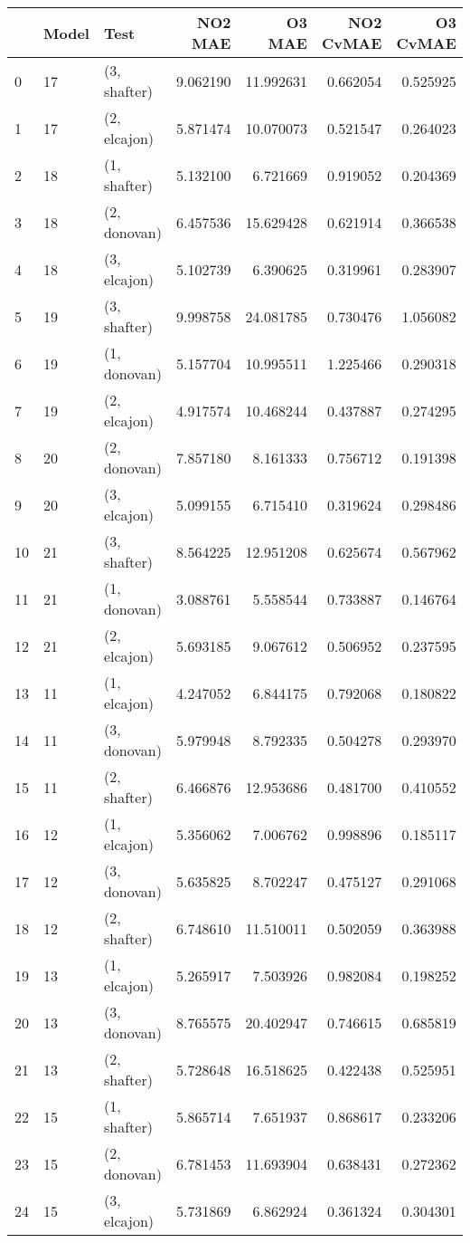 \begin{tabular}{lllrrrr}
\toprule
{} & Model &          Test &   NO2 MAE &     O3 MAE &  NO2 CvMAE &  O3 CvMAE \\
\midrule
0  &    17 &  (3, shafter) &  9.062190 &  11.992631 &   0.662054 &  0.525925 \\
1  &    17 &  (2, elcajon) &  5.871474 &  10.070073 &   0.521547 &  0.264023 \\
2  &    18 &  (1, shafter) &  5.132100 &   6.721669 &   0.919052 &  0.204369 \\
3  &    18 &  (2, donovan) &  6.457536 &  15.629428 &   0.621914 &  0.366538 \\
4  &    18 &  (3, elcajon) &  5.102739 &   6.390625 &   0.319961 &  0.283907 \\
5  &    19 &  (3, shafter) &  9.998758 &  24.081785 &   0.730476 &  1.056082 \\
6  &    19 &  (1, donovan) &  5.157704 &  10.995511 &   1.225466 &  0.290318 \\
7  &    19 &  (2, elcajon) &  4.917574 &  10.468244 &   0.437887 &  0.274295 \\
8  &    20 &  (2, donovan) &  7.857180 &   8.161333 &   0.756712 &  0.191398 \\
9  &    20 &  (3, elcajon) &  5.099155 &   6.715410 &   0.319624 &  0.298486 \\
10 &    21 &  (3, shafter) &  8.564225 &  12.951208 &   0.625674 &  0.567962 \\
11 &    21 &  (1, donovan) &  3.088761 &   5.558544 &   0.733887 &  0.146764 \\
12 &    21 &  (2, elcajon) &  5.693185 &   9.067612 &   0.506952 &  0.237595 \\
13 &    11 &  (1, elcajon) &  4.247052 &   6.844175 &   0.792068 &  0.180822 \\
14 &    11 &  (3, donovan) &  5.979948 &   8.792335 &   0.504278 &  0.293970 \\
15 &    11 &  (2, shafter) &  6.466876 &  12.953686 &   0.481700 &  0.410552 \\
16 &    12 &  (1, elcajon) &  5.356062 &   7.006762 &   0.998896 &  0.185117 \\
17 &    12 &  (3, donovan) &  5.635825 &   8.702247 &   0.475127 &  0.291068 \\
18 &    12 &  (2, shafter) &  6.748610 &  11.510011 &   0.502059 &  0.363988 \\
19 &    13 &  (1, elcajon) &  5.265917 &   7.503926 &   0.982084 &  0.198252 \\
20 &    13 &  (3, donovan) &  8.765575 &  20.402947 &   0.746615 &  0.685819 \\
21 &    13 &  (2, shafter) &  5.728648 &  16.518625 &   0.422438 &  0.525951 \\
22 &    15 &  (1, shafter) &  5.865714 &   7.651937 &   0.868617 &  0.233206 \\
23 &    15 &  (2, donovan) &  6.781453 &  11.693904 &   0.638431 &  0.272362 \\
24 &    15 &  (3, elcajon) &  5.731869 &   6.862924 &   0.361324 &  0.304301 \\
\bottomrule
\end{tabular}
